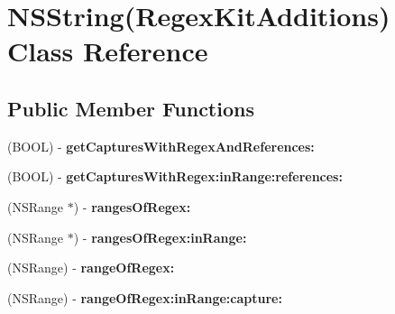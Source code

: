 \hypertarget{interface_n_s_string_07_regex_kit_additions_08}{\section{N\-S\-String(Regex\-Kit\-Additions) Class Reference}
\label{interface_n_s_string_07_regex_kit_additions_08}
}
\subsection*{Public Member Functions}
\begin{DoxyCompactItemize}
\item 
\hypertarget{interface_n_s_string_07_regex_kit_additions_08_a67b1aab5c9832ed1582d21facce6cf9e}{(B\-O\-O\-L) -\/ {\bfseries get\-Captures\-With\-Regex\-And\-References\-:}}\label{interface_n_s_string_07_regex_kit_additions_08_a67b1aab5c9832ed1582d21facce6cf9e}

\item 
\hypertarget{interface_n_s_string_07_regex_kit_additions_08_ab4e4143505576a6b0d9a1c54a779f0f0}{(B\-O\-O\-L) -\/ {\bfseries get\-Captures\-With\-Regex\-:in\-Range\-:references\-:}}\label{interface_n_s_string_07_regex_kit_additions_08_ab4e4143505576a6b0d9a1c54a779f0f0}

\item 
\hypertarget{interface_n_s_string_07_regex_kit_additions_08_aa4cfd7397de6d7632badbcf72f8bfda7}{(N\-S\-Range $\ast$) -\/ {\bfseries ranges\-Of\-Regex\-:}}\label{interface_n_s_string_07_regex_kit_additions_08_aa4cfd7397de6d7632badbcf72f8bfda7}

\item 
\hypertarget{interface_n_s_string_07_regex_kit_additions_08_ac71558c01a3a5cb98342898a2af732a6}{(N\-S\-Range $\ast$) -\/ {\bfseries ranges\-Of\-Regex\-:in\-Range\-:}}\label{interface_n_s_string_07_regex_kit_additions_08_ac71558c01a3a5cb98342898a2af732a6}

\item 
\hypertarget{interface_n_s_string_07_regex_kit_additions_08_afd16022d3c9d872db294b92f3573c9db}{(N\-S\-Range) -\/ {\bfseries range\-Of\-Regex\-:}}\label{interface_n_s_string_07_regex_kit_additions_08_afd16022d3c9d872db294b92f3573c9db}

\item 
\hypertarget{interface_n_s_string_07_regex_kit_additions_08_a376695f2d95c075af18aa527eb787a29}{(N\-S\-Range) -\/ {\bfseries range\-Of\-Regex\-:in\-Range\-:capture\-:}}\label{interface_n_s_string_07_regex_kit_additions_08_a376695f2d95c075af18aa527eb787a29}


\end{DoxyCompactItemize}
